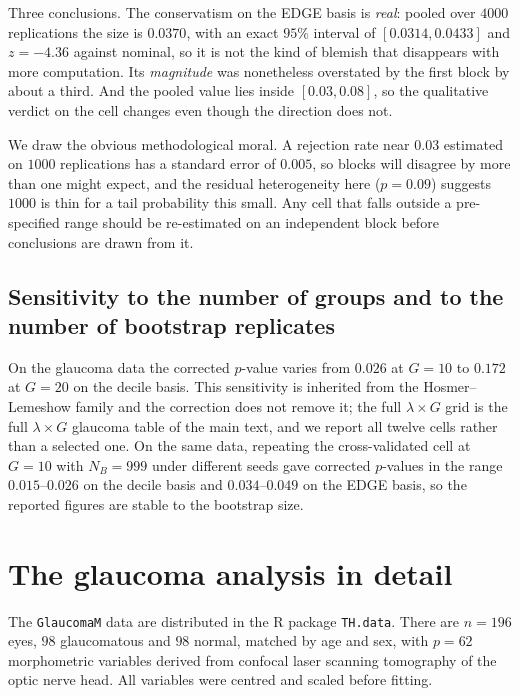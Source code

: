 \documentclass[11pt,a4paper]{article}
\theoremstyle{plain}
\theoremstyle{remark}
\begin{document}
Three conclusions. The conservatism on the EDGE basis is \emph{real}: pooled over $4000$
replications the size is $0.0370$, with an exact $95\%$ interval of $[0.0314, 0.0433]$
and $z = -4.36$ against nominal, so it is not the kind of blemish that disappears with
more computation. Its \emph{magnitude} was nonetheless overstated by the first block by
about a third. And the pooled value lies inside $[0.03, 0.08]$, so the qualitative
verdict on the cell changes even though the direction does not.

We draw the obvious methodological moral. A rejection rate near $0.03$ estimated on
$1000$ replications has a standard error of $0.005$, so blocks will disagree by more than
one might expect, and the residual heterogeneity here ($p = 0.09$) suggests $1000$ is
thin for a tail probability this small. Any cell that falls outside a pre-specified range
should be re-estimated on an independent block before conclusions are drawn from it.

\subsection{Sensitivity to the number of groups and to the number of bootstrap
replicates}\label{sec:sensitivity}

On the glaucoma data the corrected $p$-value varies from $0.026$ at $G = 10$ to $0.172$
at $G = 20$ on the decile basis. This sensitivity is inherited from the
Hosmer--Lemeshow family and the correction does not remove it; the full $\lambda\times G$
grid is the full $\lambda\times G$ glaucoma table of the main text, and we report all twelve cells rather than a selected
one. On the same data, repeating the cross-validated cell at $G=10$ with $N_B = 999$
under different seeds gave corrected $p$-values in the range $0.015$--$0.026$ on the
decile basis and $0.034$--$0.049$ on the EDGE basis, so the reported figures are stable
to the bootstrap size.


\section{The glaucoma analysis in detail}\label{sec:glaucoma}

The \texttt{GlaucomaM} data are distributed in the R package \texttt{TH.data}. There are
$n = 196$ eyes, $98$ glaucomatous and $98$ normal, matched by age and sex, with $p = 62$
morphometric variables derived from confocal laser scanning tomography of the optic nerve
head. All variables were centred and scaled before fitting.
\end{document}
